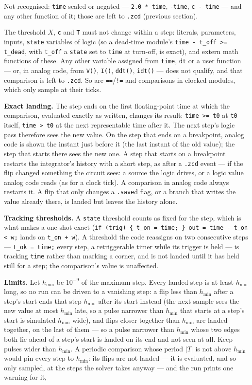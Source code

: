 \documentclass[11pt, a4paper]{article}
\newcommand{\code}[1]{\texttt{\small #1}}
\begin{document}
\noindent Not recognised: \code{time} scaled or negated --- \code{2.0 * time},
\code{-time}, \code{c - time} --- and any other function of it; those are
left to \code{.zcd} (previous section).

The threshold \(X\), \code{c} and \code{T} must not change within a step:
literals, parameters, inputs, \code{state} variables of logic (so a dead-time
module's \code{time - t\_off >= t\_dead}, with \code{t\_off} a \code{state}
set to \code{time} at turn-off, is exact), and extern math functions of these.
Any other variable assigned from \code{time}, \code{dt} or a user function ---
or, in analog code, from \code{V()}, \code{I()}, \code{ddt()}, \code{idt()} ---
does not qualify, and that comparison is left to \code{.zcd}. So are
\code{==}/\code{!=} and comparisons in clocked modules, which only sample at
their ticks.

\textbf{Exact landing.} The step ends on the first floating-point time at which
the comparison, evaluated exactly as written, changes its result: \code{time
>= t0} at \code{t0} itself, \code{time > t0} at the next representable time
after it. The next step's logic pass therefore sees the new value. On the step
that ends on a breakpoint, analog code is shown the instant just before it
(the last instant of the old value); the step that starts there sees the new
one. A step that starts on a breakpoint restarts the integrator's history with
a short step, as after a \code{.zcd} event --- if the flip changed something
the circuit sees: a source the logic drives, or a logic value analog code
reads (as for a clock tick). A comparison in analog code always restarts it.
A flip that only changes a \code{.save}d flag, or a branch that writes the
value already there, is landed but leaves the history alone.

\textbf{Tracking thresholds.} A \code{state} threshold counts as fixed for
the step, which is what makes a one-shot exact (\code{if (trig) \{ t\_on =
time; \} out = time - t\_on < w;} lands on \code{t\_on + w}). A threshold
the code reassigns on two consecutive steps --- \code{t\_ok = time;} every
step, a retriggerable timer while its trigger is held --- is tracking
\code{time} rather than marking a corner, and is not landed until it has held
still for a step; the comparison's value is unaffected.

\textbf{Limits.} Let \(h_{\min}\) be \(10^{-9}\) of the maximum step. Every
landed step is at least \(h_{\min}\) long, so no run can be driven to a
vanishing step: a flip less than \(h_{\min}\) after a step's start ends that
step \(h_{\min}\) after its start instead (the next sample sees the new value
at most \(h_{\min}\) late, so a pulse narrower than \(h_{\min}\) that starts
at a step's start is simulated \(h_{\min}\) wide), and flips closer together
than \(h_{\min}\) are landed together, on the last of them --- so a pulse
narrower than \(h_{\min}\) whose two edges both lie ahead of a step's start
is landed on its end and not seen at all. Keep pulses wider than
\(h_{\min}\). A periodic comparison whose period
\(|T|\) is not above \(h_{\min}\) would pin every step to \(h_{\min}\): its
flips are not landed --- it is evaluated, and so only sampled, at the steps
the solver takes anyway --- and the run prints one warning for it,
\end{document}
